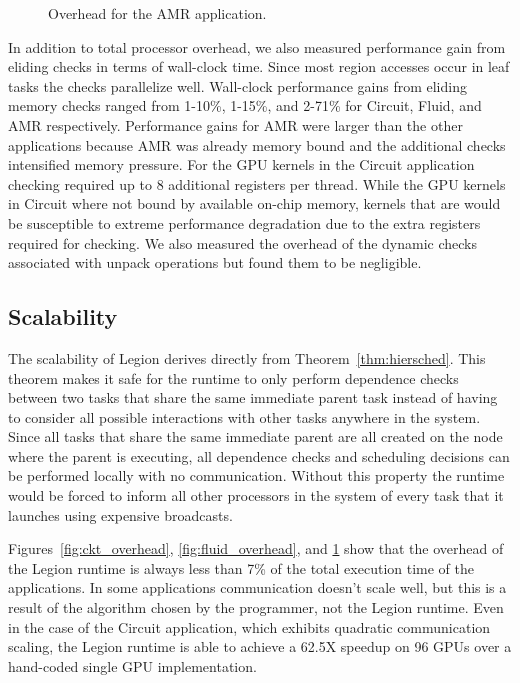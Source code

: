 \begin{figure}
\begin{center}
{\label{fig:amr16384}
}
\end{center}
\vspace{-2mm}
\caption{Overhead for the AMR application.\label{fig:amr_overhead}}
\vspace{-6mm}
\end{figure}

In addition to total processor overhead, we also measured performance gain from eliding checks in 
terms of wall-clock time.  Since most region accesses occur in leaf tasks the checks parallelize 
well.  Wall-clock performance gains from eliding memory checks ranged from 1-10\%, 1-15\%, 
and 2-71\% for Circuit, Fluid, and AMR respectively.  Performance gains for AMR were larger than
the other applications because AMR was already memory bound and the additional checks intensified
memory pressure.  For the GPU kernels in the Circuit application checking required up to 8 additional 
registers per thread.  While the GPU kernels in Circuit where not bound by 
available on-chip memory, kernels that are would be susceptible to extreme performance 
degradation due to the extra registers required for checking.  We also measured the overhead
of the dynamic checks associated with unpack operations but found them to be negligible.

\subsection{Scalability}
\label{subsec:scalability}
The scalability of Legion derives directly from Theorem~\ref{thm:hiersched}.  This 
theorem makes it safe for the runtime to only perform dependence checks between two
tasks that share the same immediate parent task instead of having to consider all
possible interactions with other tasks anywhere in the system.  Since all tasks that
share the same immediate parent are all created on the node where the parent is executing,
all dependence checks and scheduling decisions can be performed locally with no communication.  
Without this property the runtime would be forced to inform all other processors in the system 
of every task that it launches using expensive broadcasts. 

Figures~\ref{fig:ckt_overhead}, \ref{fig:fluid_overhead}, and \ref{fig:amr_overhead} show that
the overhead of the Legion runtime is always less than 7\% of the total execution time
of the applications.  In some applications communication doesn't scale well, but this is
a result of the algorithm chosen by the programmer, not the Legion runtime.
Even in the case of the Circuit application, which exhibits quadratic communication scaling, the Legion
runtime is able to achieve a 62.5X speedup on 96 GPUs over a hand-coded single GPU implementation\cite{Legion12}.

